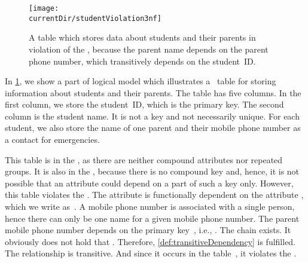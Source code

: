 %
\FloatBarrier%
%
\begin{figure}%
\centering%
%
\texttt{[image: \\currentDir/studentViolation3nf]}%
%
\caption{A table which stores data about students and their parents in violation of the , because the parent name depends on the parent phone number, which transitively depends on the student~ID.}%
\label{fig:studentViolation3nf}%
\end{figure}%
%
%
%
%
%
%
%
%
%
%
%
%
%
In \cref{fig:studentViolation3nf}, we show a part of logical model which illustrates a \db\ table for storing information about students and their parents.
The table has five columns.
In the first column, we store the student~ID, which is the primary key.
The second column is the student name.
It is not a key and not necessarily unique.
For each student, we also store the name of one parent and their mobile phone number as a contact for emergencies.

This table is in the , as there are neither compound attributes nor repeated groups.
It is also in the , because there is no compound key and, hence, it is not possible that an attribute could depend on a part of such a key only.
However, this table violates the .
The attribute  is functionally dependent on the attribute , which we write as~.
A mobile phone number is associated with a single person, hence there can only be one name for a given mobile phone number.
The parent mobile phone number depends on the primary key~, i.e., .
The chain  exists.
It obviously does not hold that .
Therefore, \cref{def:transitiveDependency} is fulfilled.
The relationship  is transitive.
And since it occurs in the table~, it violates the .

